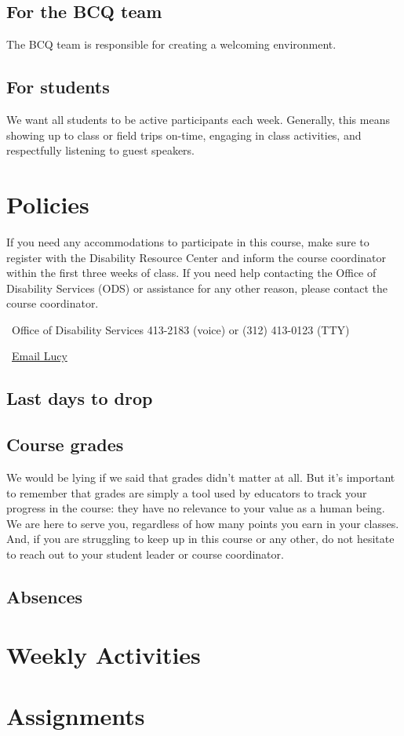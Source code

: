 \documentclass[]{article}
\begin{document}
\subsection{For the BCQ team}

The BCQ team is responsible for creating a welcoming environment. 

\subsection{For students}

We want all students to be active participants each week. Generally, this means showing up to class or field trips on-time, engaging in class activities, and respectfully listening to guest speakers.

\section{Policies}

If you need any accommodations to participate in this course, make sure to register with the Disability Resource Center and inform the course coordinator within the first three weeks of class. If you need help contacting the Office of Disability Services (ODS) or assistance for any other reason, please contact the course coordinator.

\faPhone\ Office of Disability Services 413-2183 (voice) or (312) 413-0123 (TTY)

\faLaptop\ \href{mailto:ldelan5@uic.edu}{Email Lucy}

\subsection{Last days to drop}

\subsection{Course grades}

We would be lying if we said that grades didn’t matter at all. But it’s important to remember that grades are simply a tool used by educators to track your progress in the course: they have no relevance to your value as a human being. We are here to serve you, regardless of how many points you earn in your classes. And, if you are struggling to keep up in this course or any other, do not hesitate to reach out to your student leader or course coordinator.

\subsection{Absences}

\section{Weekly Activities}

\section{Assignments}
\end{document}
